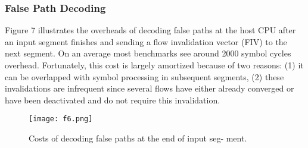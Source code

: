 \subsubsection{False Path Decoding} 
Figure 7 illustrates the overheads of decoding false paths at the host CPU after an input segment finishes
and sending a flow invalidation vector (FIV) to the next segment.
On an average most benchmarks see around 2000 symbol cycles
overhead. Fortunately, this cost is largely amortized because of two
reasons: (1) it can be overlapped with symbol processing in subsequent segments, (2) these invalidations are infrequent since several
flows have either already converged or have been deactivated and do
not require this invalidation.
\begin{figure}[!]
    \texttt{[image: f6.png]}
    \centering
    \caption{Costs of decoding false paths at the end of input seg-
    ment.}
\end{figure}